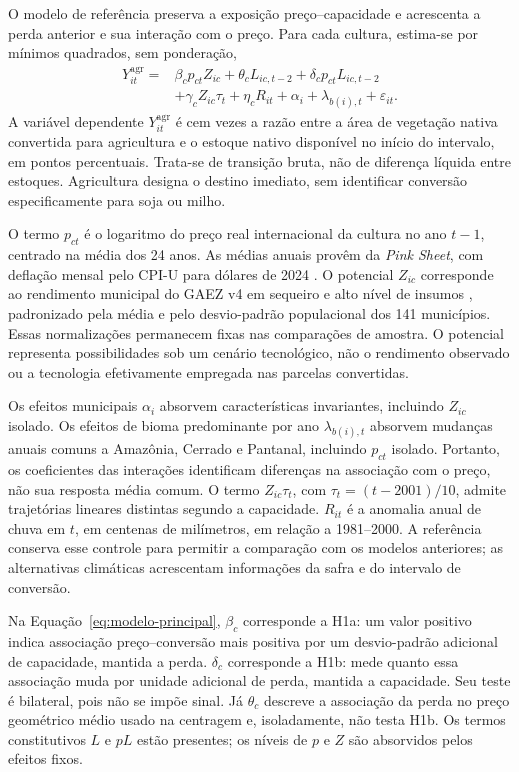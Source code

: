 O modelo de referência preserva a exposição preço--capacidade e acrescenta a perda anterior e sua interação com o preço. Para cada cultura, estima-se por mínimos quadrados, sem ponderação,
\begin{equation}
\begin{aligned}
Y_{it}^{\mathrm{agr}}={}&\beta_c p_{ct}Z_{ic}+\theta_c L_{ic,t-2}
 +\delta_c p_{ct}L_{ic,t-2}\\
&+\gamma_c Z_{ic}\tau_t+\eta_c R_{it}
 +\alpha_i+\lambda_{b(i),t}+\varepsilon_{it}.
\end{aligned}
\label{eq:modelo-principal}
\end{equation}
A variável dependente $Y_{it}^{\mathrm{agr}}$ é cem vezes a razão entre a área de vegetação nativa convertida para agricultura e o estoque nativo disponível no início do intervalo, em pontos percentuais. Trata-se de transição bruta, não de diferença líquida entre estoques. Agricultura designa o destino imediato, sem identificar conversão especificamente para soja ou milho.

O termo $p_{ct}$ é o logaritmo do preço real internacional da cultura no ano $t-1$, centrado na média dos 24 anos. As médias anuais provêm da \textit{Pink Sheet}, com deflação mensal pelo CPI-U para dólares de 2024 \cite{WorldBank2026,BLSCPI2026}. O potencial $Z_{ic}$ corresponde ao rendimento municipal do GAEZ v4 em sequeiro e alto nível de insumos \cite{FAOGAEZ2021}, padronizado pela média e pelo desvio-padrão populacional dos 141 municípios. Essas normalizações permanecem fixas nas comparações de amostra. O potencial representa possibilidades sob um cenário tecnológico, não o rendimento observado ou a tecnologia efetivamente empregada nas parcelas convertidas.

Os efeitos municipais $\alpha_i$ absorvem características invariantes, incluindo $Z_{ic}$ isolado. Os efeitos de bioma predominante por ano $\lambda_{b(i),t}$ absorvem mudanças anuais comuns a Amazônia, Cerrado e Pantanal, incluindo $p_{ct}$ isolado. Portanto, os coeficientes das interações identificam diferenças na associação com o preço, não sua resposta média comum. O termo $Z_{ic}\tau_t$, com $\tau_t=(t-2001)/10$, admite trajetórias lineares distintas segundo a capacidade. $R_{it}$ é a anomalia anual de chuva em $t$, em centenas de milímetros, em relação a 1981--2000. A referência conserva esse controle para permitir a comparação com os modelos anteriores; as alternativas climáticas acrescentam informações da safra e do intervalo de conversão.

Na Equação~\eqref{eq:modelo-principal}, $\beta_c$ corresponde a H1a: um valor positivo indica associação preço--conversão mais positiva por um desvio-padrão adicional de capacidade, mantida a perda. $\delta_c$ corresponde a H1b: mede quanto essa associação muda por unidade adicional de perda, mantida a capacidade. Seu teste é bilateral, pois não se impõe sinal. Já $\theta_c$ descreve a associação da perda no preço geométrico médio usado na centragem e, isoladamente, não testa H1b. Os termos constitutivos $L$ e $pL$ estão presentes; os níveis de $p$ e $Z$ são absorvidos pelos efeitos fixos.

